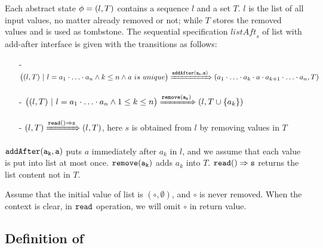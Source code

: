 \begin{example}
\label{definition:sequential specification of or-set} 
Each abstract state $\phi = (l,T)$ contains a sequence $l$ and a set $T$. $l$ is the list of all input values, no matter already removed or not; while $T$ stores the removed values and is used as tombstone. The sequential specification $\mathit{listAft}_s$ of list with add-after interface is given with the transitions as follows: 

\begin{itemize}
\setlength{\itemsep}{0.5pt}
\item[-] $\big((l,T)\ |\ l = a_1 \cdot \ldots \cdot a_n \wedge k \leq n \wedge a \ is \ unique \big) \xRightarrow{ \alabelshort[{\tt addAfter}]{a_k,a} } (a_1 \cdot \ldots \cdot a_k \cdot a \cdot a_{k+1} \cdot \ldots \cdot a_n,T)$ 

\item[-] $\big((l,T)\ |\ l = a_1\cdot \ldots \cdot a_n \wedge 1 \leq k \leq n \big) \xRightarrow{ \alabelshort[{\tt remove}]{a_k} } (l,T \cup \{ a_k \})$ 

\item[-] $(l,T) \xRightarrow{\alabellong[{\tt read}]{}{s}{}} (l,T)$, here $s$ is obtained from $l$ by removing values in $T$ 
\end{itemize}

$\alabelshort[{\tt addAfter}]{a_k,a}$ puts $a$ immediately after $a_k$ in $l$, and we assume that each value is put into list at most once. $\alabelshort[{\tt remove}]{a_k}$ adds $a_k$ into $T$. $\alabellong[{\tt read}]{}{s}{}$ returns the list content not in $T$. 

Assume that the initial value of list is $(\circ,\emptyset)$, and $\circ$ is never removed. When the context is clear, in $\ensuremath{\tt read}$ operation, we will omit $\circ$ in return value.
\end{example}



\subsection{Definition of \CRDTLin{}}
\label{subsec:definition of distributed linearizability}

